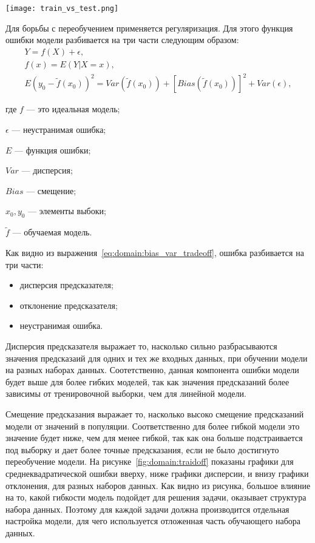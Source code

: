 \begin{center}
  \texttt{[image: train\_vs\_test.png]}
  \label{fig:domain:train_vs_test}
\end{center}

Для борьбы с переобучением применяется регуляризация. Для этого функция ошибки модели разбивается на три части следующим образом:
\begin{gather}
  Y = f(X) + \epsilon,\\
  f(x) = E(Y|X=x),\\
  \label{eq:domain:bias_var_tradeoff}
  E{(y_0-\tilde{f}(x_0))}^2 = Var(\tilde{f}(x_0)) + {[Bias(\tilde{f}(x_0))]}^2 + Var(\epsilon),
\end{gather}
\begin{explanationx}
\item[где] $f$ --- это идеальная модель;
\item $\epsilon$ --- неустранимая ошибка;
\item $E$ --- функция ошибки;
\item $Var$ --- дисперсия;
\item $Bias$ --- смещение;
\item $x_0, y_0$ --- элементы выбоки;
\item $\tilde{f}$ --- обучаемая модель.
\end{explanationx}

Как видно из выражения~\ref{eq:domain:bias_var_tradeoff}, ошибка разбивается на три части:
\begin{itemize}
\item дисперсия предсказателя;
\item отклонение предсказателя;
\item неустранимая ошибка.
\end{itemize}

Дисперсия предсказателя выражает то, насколько сильно разбрасываются значения предсказаий для одних и тех же входных данных, при обучении модели на разных наборах данных. Соотетственно, данная компонента ошибки модели будет выше для более гибких моделей, так как значения предсказаний более зависимы от тренировочной выборки, чем для линейной модели.

Смещение предсказания выражает то, насколько высоко смещение предсказаний модели от значений в популяции. Соответственно для более гибкой модели это значение будет ниже, чем для менее гибкой, так как она больше подстраивается под выборку и дает более точные предсказания, если не было достигнуто переобучение модели. На рисунке~\ref{fig:domain:traidoff} показаны графики для среднеквадратической ошибки вверху, ниже графики дисперсии, и внизу графики отклонения, для разных наборов данных. Как видно из рисунка, большое влияние на то, какой гибкости модель подойдет для решения задачи, оказывает структура набора данных. Поэтому для каждой задачи должна производится отдельная настройка модели, для чего используется отложенная часть обучающего набора данных.


